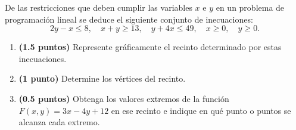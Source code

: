 
De las restricciones que deben cumplir las variables $x$ e $y$ en un problema de programación lineal se deduce el siguiente conjunto de inecuaciones:
\[
2y-x\leq8,\quad x+y\geq13,\quad y+4x\leq49,\quad x\geq0,\quad y\geq0.
\]
\begin{enumerate}[label=\alph*)]
\item \textbf{(1.5 puntos)} Represente gráficamente el recinto determinado por estas inecuaciones.
\item \textbf{(1 punto)} Determine los vértices del recinto.
\item \textbf{(0.5 puntos)} Obtenga los valores extremos de la función $F(x,y)=3x-4y+12$ en ese recinto e indique en qué punto o puntos se alcanza cada extremo.
\end{enumerate}
